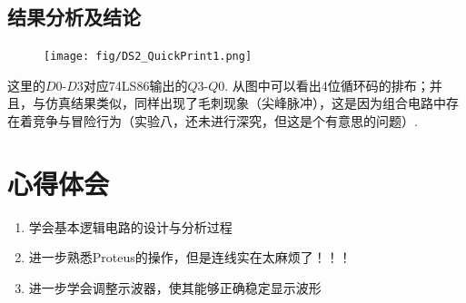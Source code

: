 \documentclass[11pt,UTF8]{ctexart}
\begin{document}
\subsection{结果分析及结论}
\begin{figure}[H]
\centering
\texttt{[image: fig/DS2\_QuickPrint1.png]}
\label{Fig:DS2}
\end{figure}
这里的$D0$-$D3$对应74LS86输出的$Q3$-$Q0$. 从图中可以看出4位循环码的排布；并且，与仿真结果类似，同样出现了毛刺现象（尖峰脉冲），这是因为组合电路中存在着竞争与冒险行为（实验八，还未进行深究，但这是个有意思的问题）.


\section{心得体会}
\begin{enumerate}
    \item 学会基本逻辑电路的设计与分析过程
    \item 进一步熟悉Proteus的操作，但是连线实在太麻烦了！！！
    \item 进一步学会调整示波器，使其能够正确稳定显示波形
\end{enumerate}
\end{document}
